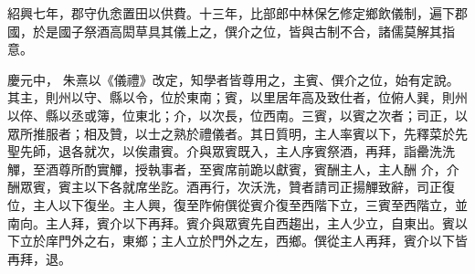 \begin{pinyinscope}
 紹興七年，郡守仇悆置田以供費。十三年，比部郎中林保乞修定鄉飲儀制，遍下郡國，於是國子祭酒高閎草具其儀上之，僎介之位，皆與古制不合，諸儒莫解其指意。



 慶元中，
 朱熹以《儀禮》改定，知學者皆尊用之，主賓、僎介之位，始有定說。其主，則州以守、縣以令，位於東南；賓，以里居年高及致仕者，位俯人巽，則州以倅、縣以丞或簿，位東北；介，以次長，位西南。三賓，以賓之次者；司正，以眾所推服者；相及贊，以士之熟於禮儀者。其日質明，主人率賓以下，先釋菜於先聖先師，退各就次，以俟肅賓。介與眾賓既入，主人序賓祭酒，再拜，詣罍洗洗觶，至酒尊所酌實觶，授執事者，至賓席前跪以獻賓，賓酬主人，主人酬
 介，介酬眾賓，賓主以下各就席坐訖。酒再行，次沃洗，贊者請司正揚觶致辭，司正復位，主人以下復坐。主人興，復至阼俯僎從賓介復至西階下立，三賓至西階立，並南向。主人拜，賓介以下再拜。賓介與眾賓先自西趨出，主人少立，自東出。賓以下立於庠門外之右，東鄉；主人立於門外之左，西鄉。僎從主人再拜，賓介以下皆再拜，退。



\end{pinyinscope}